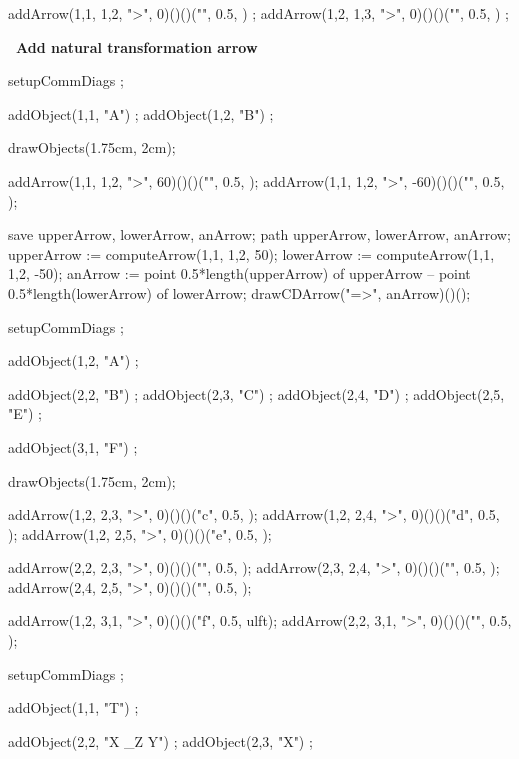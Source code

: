   addArrow(1,1, 1,2, ">", 0)()()("", 0.5, ) ;
  addArrow(1,2, 1,3, ">", 0)()()("", 0.5, ) ;
\stopMPcode\stopformula
\stopbuffer

\processTEXbuffer

\typebuffer

{\bf \color[red]\ Add natural transformation arrow}

\startbuffer
\startformula{}
  setupCommDiags ;
  
  addObject(1,1, "A") ;
  addObject(1,2, "B") ;
  
  drawObjects(1.75cm, 2cm);
  
  addArrow(1,1, 1,2, ">",  60)()()("", 0.5, );
  addArrow(1,1, 1,2, ">", -60)()()("", 0.5, );
  
  save upperArrow, lowerArrow, anArrow;
  path upperArrow, lowerArrow, anArrow;
  upperArrow := computeArrow(1,1, 1,2,  50);
  lowerArrow := computeArrow(1,1, 1,2, -50);
  anArrow    := 
    point 0.5*length(upperArrow) of upperArrow --
    point 0.5*length(lowerArrow) of lowerArrow;
  drawCDArrow("=>", anArrow)()();
\stopMPcode\stopformula
\stopbuffer

\processTEXbuffer

\typebuffer

\startbuffer
\startformula{}
  setupCommDiags ;
  
  addObject(1,2, "A") ;
  
  addObject(2,2, "B") ;
  addObject(2,3, "C") ;
  addObject(2,4, "D") ;
  addObject(2,5, "E") ;
  
  addObject(3,1, "F") ;
  
  drawObjects(1.75cm, 2cm);
  
  addArrow(1,2, 2,3, ">", 0)()()("c", 0.5, );
  addArrow(1,2, 2,4, ">", 0)()()("d", 0.5, );
  addArrow(1,2, 2,5, ">", 0)()()("e", 0.5, );

  addArrow(2,2, 2,3, ">", 0)()()("", 0.5, );
  addArrow(2,3, 2,4, ">", 0)()()("", 0.5, );
  addArrow(2,4, 2,5, ">", 0)()()("", 0.5, );
  
  addArrow(1,2, 3,1, ">", 0)()()("f", 0.5, ulft);
  addArrow(2,2, 3,1, ">", 0)()()("",  0.5, );
\stopMPcode\stopformula
\stopbuffer

\processTEXbuffer

\typebuffer

\startbuffer
\startformula{}
  setupCommDiags ;
  
  addObject(1,1, "T") ;
  
  addObject(2,2, "X \times_Z Y") ;
  addObject(2,3, "X") ;
  
